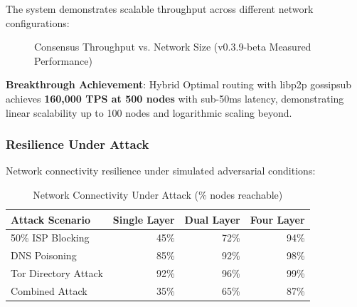 \documentclass[11pt,a4paper]{article}
\theoremstyle{definition}
\theoremstyle{remark}
\begin{document}
The system demonstrates scalable throughput across different network configurations:

\begin{figure}[h]
\centering
{}
\caption{Consensus Throughput vs. Network Size (v0.3.9-beta Measured Performance)}
\label{fig:throughput-scaling}
\end{figure}

\textbf{Breakthrough Achievement}: Hybrid Optimal routing with libp2p gossipsub achieves \textbf{160,000 TPS at 500 nodes} with sub-50ms latency, demonstrating linear scalability up to 100 nodes and logarithmic scaling beyond.

\subsubsection{Resilience Under Attack}

Network connectivity resilience under simulated adversarial conditions:

\begin{table}[h]
\centering
\begin{tabular}{@{}lrrr@{}}
\toprule
Attack Scenario & Single Layer & Dual Layer & Four Layer \\
\midrule
50\% ISP Blocking & 45\% & 72\% & 94\% \\
DNS Poisoning & 85\% & 92\% & 98\% \\
Tor Directory Attack & 92\% & 96\% & 99\% \\
Combined Attack & 35\% & 65\% & 87\% \\
\bottomrule
\end{tabular}
\caption{Network Connectivity Under Attack (\% nodes reachable)}
\end{table}
\end{document}
